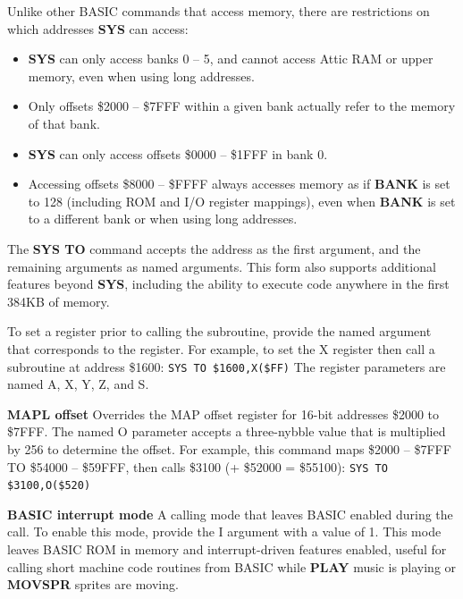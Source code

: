 \begin{description}[leftmargin=2cm,style=nextline]
                  Unlike other BASIC commands that access memory, there are restrictions on which addresses {\bf SYS} can access:

                  \begin{itemize}
                     \item {\bf SYS} can only access banks 0 -- 5, and cannot access Attic RAM or upper memory, even when using long addresses.
                     \item Only offsets \$2000 -- \$7FFF within a given bank actually refer to the memory of that bank.
                     \item {\bf SYS} can only access offsets \$0000 -- \$1FFF in bank 0.
                     \item Accessing offsets \$8000 -- \$FFFF always accesses memory as if {\bf BANK} is set to 128 (including ROM and I/O register mappings), even when {\bf BANK} is set to a different bank or when using long addresses.
                  \end{itemize}

\item [SYS TO form:] The {\bf SYS TO} command accepts the address as the first argument, and the remaining arguments as named arguments. This form also supports additional features beyond {\bf SYS}, including the ability to execute code anywhere in the first 384KB of memory.

                  To set a register prior to calling the subroutine, provide the named argument that corresponds to the register. For example, to set the X register then call a subroutine at address \$1600: \texttt{SYS TO \$1600,X(\$FF)} The register parameters are named A, X, Y, Z, and S.

                  {\bf MAPL offset} Overrides the MAP offset register for 16-bit addresses \$2000 to \$7FFF. The named O parameter accepts a three-nybble value that is multiplied by 256 to determine the offset. For example, this command maps \$2000 -- \$7FFF TO \$54000 -- \$59FFF, then calls \$3100 (+ \$52000 = \$55100): \texttt{SYS TO \$3100,O(\$520)}

                  {\bf BASIC interrupt mode} A calling mode that leaves BASIC enabled during the call. To enable this mode, provide the I argument with a value of 1. This mode leaves BASIC ROM in memory and interrupt-driven features enabled, useful for calling short machine code routines from BASIC while {\bf PLAY} music is playing or {\bf MOVSPR} sprites are moving.


\end{description}
